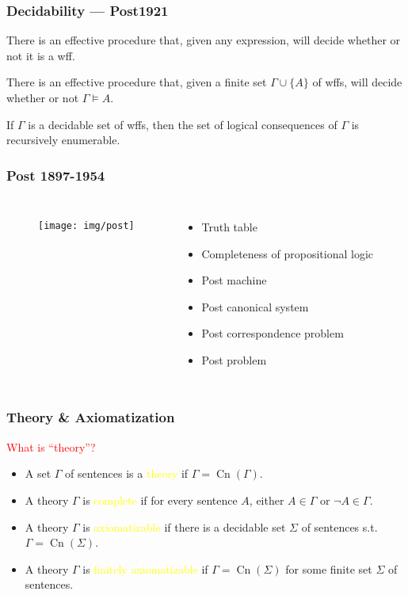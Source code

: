 \documentclass[UTF8,11pt,colorlinks,compress,openany]{beamer}%
\begin{document}
\begin{frame}\frametitle{Decidability --- Post1921}
	\begin{theorem}
		There is an effective procedure that, given any expression, will decide whether or not it is a wff.
	\end{theorem}
	\begin{theorem}
		There is an effective procedure that, given a finite set $\Gamma\cup\{A\}$ of wffs, will decide whether or not $\Gamma\vDash A$.
	\end{theorem}
	\begin{theorem}
		If $\Gamma$ is a decidable set of wffs, then the set of logical consequences of $\Gamma$ is recursively enumerable.
	\end{theorem}
\end{frame}

\begin{frame}\frametitle{Post 1897-1954}
\begin{columns}
\begin{figure}
	\texttt{[image: img/post]}
\end{figure}
\begin{itemize}
	\item Truth table
	\item Completeness of propositional logic
	\item Post machine
	\item Post canonical system
	\item Post correspondence problem
	\item Post problem
\end{itemize}
\end{columns}
\end{frame}

\begin{frame}\frametitle{Theory \& Axiomatization}
	\begin{block}{}
		\centering\textcolor{red}{What is ``theory''?}
	\end{block}
	\begin{itemize}
		\item A set $\Gamma$ of sentences is a \textcolor{yellow}{theory} if $\Gamma=\operatorname{Cn}(\Gamma)$.
		\item A theory $\Gamma$ is \textcolor{yellow}{complete} if for every sentence $A$, either $A\in\Gamma$ or $\neg A\in\Gamma$.
		\item A theory $\Gamma$ is \textcolor{yellow}{axiomatizable} if there is a decidable set $\Sigma$ of sentences s.t. $\Gamma=\operatorname{Cn}(\Sigma)$.
		\item A theory $\Gamma$ is \textcolor{yellow}{finitely axiomatizable} if $\Gamma=\operatorname{Cn}(\Sigma)$ for some finite set $\Sigma$ of sentences.
	\end{itemize}
\end{frame}
\end{document}

